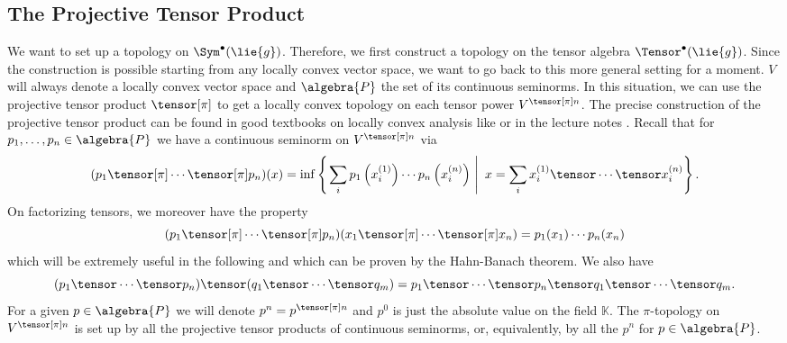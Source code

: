 \subsection{The Projective Tensor Product}

We want to set up a topology on $\Sym^{\bullet}(\lie{g})$. Therefore, 
we first construct a topology on the tensor algebra $\Tensor^{\bullet}
(\lie{g})$. Since the construction is possible starting from any locally 
convex vector space, we want to go back to this more general setting for a 
moment. $V$ will always denote a locally convex vector space and $\algebra{P}$ 
the set of its continuous seminorms. In this situation, we can use the 
projective tensor product $\tensor[\pi]$ to get a locally convex 
topology on each tensor power $V^{\tensor[\pi] n}$. The precise construction 
of the projective tensor product can be found in good textbooks on locally 
convex analysis like \cite[Chapter 15]{jarchow:1981a} or in the lecture notes 
\cite[Lemma 4.1.4]{waldmann:2014a:script}. 
Recall that for $p_1, \ldots, p_n \in \algebra{P}$ we have a continuous 
seminorm on $V^{\tensor[\pi] n}$ via
\begin{equation*}
	(p_1 \tensor[\pi] \cdots \tensor[\pi] p_n)(x)
	=
	\inf
	\left\{
	\left.
		\sum_i
		p_1 \left( x_i^{(1)} \right)
		\cdots
		p_n \left( x_i^{(n)} \right)
	\ \right| \
		x
		=
		\sum_i
		x_i^{(1)}
		\tensor \cdots \tensor
		x_i^{(n)}
	\right\}.
\end{equation*}
On factorizing tensors, we moreover have the property
\begin{equation}
	\label{LCAna:FactorTensor}
	(p_1 \tensor[\pi] \cdots \tensor[\pi] p_n)
	(x_1 \tensor[\pi] \cdots \tensor[\pi] x_n)
	=
	p_1(x_1) \cdots p_n(x_n)
\end{equation}
which will be extremely useful in the following and which can be proven by
the Hahn-Banach theorem. We also have 
\begin{equation*}
	(p_1 \tensor \cdots \tensor p_n) 
	\tensor 
	(q_1 \tensor \cdots \tensor q_m) 
	= 
	p_1 \tensor \cdots \tensor p_n \tensor q_1 \tensor \cdots \tensor q_m.
\end{equation*}
For a given $p \in \algebra{P}$ we will denote $p^n = p^{\tensor[\pi] n}$ and 
$p^0$ is just the absolute value on the field $\mathbb{K}$. The $\pi$-topology 
on $V^{\tensor[\pi] n}$ is set up by all the projective tensor products of 
continuous seminorms, or, equivalently, by all the $p^n$ for $p \in 
\algebra{P}$.

